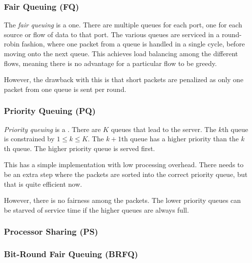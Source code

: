 \subsubsection{Fair Queuing (FQ)}\label{subsubsec:Fair_Queuing}
\begin{definition}\label{def:Fair_Queuing}
  The \emph{fair queuing}  is a  one.
  There are multiple queues for each port, one for each source or flow of data to that port.
  The various queues are serviced in a round-robin fashion, where one packet from a queue is handled in a single cycle, before moving onto the next queue.
  This achieves load balancing among the different flows, meaning there is no advantage for a particular flow to be greedy.

  However, the drawback with this is that short packets are penalized as only one packet from one queue is sent per round.
\end{definition}

\subsubsection{Priority Queuing (PQ)}\label{subsubsec:Priority_Queuing}
\begin{definition}\label{def:Priority_Queuing}
  \emph{Priority queuing} is a  .
  There are $K$ queues that lead to the server.
  The $k$th queue is constrained by $1 \leq k \leq K$.
  The $k+1$th queue has a higher priority than the $k$th queue.
  The higher priority queue is served first.

  This has a simple implementation with low processing overhead.
  There needs to be an extra step where the packets are sorted into the correct priority queue, but that is quite efficient now.

  However, there is no fairness among the packets.
  The lower priority queues can be starved of service time if the higher queues are always full.
\end{definition}

\subsubsection{Processor Sharing (PS)}\label{subsubsec:Processor_Sharing}
\subsubsection{Bit-Round Fair Queuing (BRFQ)}\label{subsubsec:Bit_Round_Fair_Queuing}
